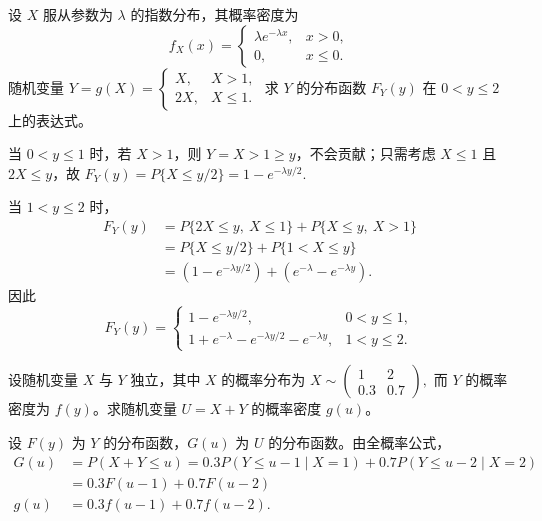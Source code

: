 \documentclass[lang=cn,11pt]{elegantbook}
\begin{document}
\begin{exercise}\label{exer:src-2012-b-07-2credit}
设 \(X\) 服从参数为 \(\lambda\) 的指数分布，其概率密度为
\[
f_X(x)=
\begin{cases}
\lambda e^{-\lambda x}, & x>0,\\
0, & x\le0.
\end{cases}
\]
随机变量
\(
Y=g(X)=
\begin{cases}
X, & X>1,\\
2X, & X\le1.
\end{cases}
\)
求 \(Y\) 的分布函数 \(F_Y(y)\) 在 \(0<y\le2\) 上的表达式。
\end{exercise}
\begin{solution}
当 \(0<y\le1\) 时，若 \(X>1\)，则 \(Y=X>1\ge y\)，不会贡献；只需考虑 \(X\le1\) 且 \(2X\le y\)，故
\(
F_Y(y)=P\{X\le y/2\}=1-e^{-\lambda y/2}.
\)

当 \(1<y\le2\) 时，
\[
\begin{aligned}
F_Y(y)
&=P\{2X\le y,\ X\le1\}+P\{X\le y,\ X>1\}\\
&=P\{X\le y/2\}+P\{1<X\le y\}\\
&=(1-e^{-\lambda y/2})+(e^{-\lambda}-e^{-\lambda y}).
\end{aligned}
\]
因此
\[
F_Y(y)=
\begin{cases}
1-e^{-\lambda y/2}, & 0<y\le1,\\
1+e^{-\lambda}-e^{-\lambda y/2}-e^{-\lambda y}, & 1<y\le2.
\end{cases}
\]
\end{solution}

\begin{exercise}\label{exer:src-2011-a-06-2credit}
设随机变量 \(X\) 与 \(Y\) 独立，其中 \(X\) 的概率分布为
\(
X\sim
\begin{pmatrix}
1 & 2\\
0.3 & 0.7
\end{pmatrix},
\)
而 \(Y\) 的概率密度为 \(f(y)\)。求随机变量 \(U=X+Y\) 的概率密度 \(g(u)\)。
\end{exercise}
\begin{solution}
设 \(F(y)\) 为 \(Y\) 的分布函数，\(G(u)\) 为 \(U\) 的分布函数。由全概率公式，
\[
\begin{aligned}
G(u)
&=P(X+Y\le u)=0.3P(Y\le u-1\mid X=1)+0.7P(Y\le u-2\mid X=2)\\
&=0.3F(u-1)+0.7F(u-2)\\
g(u)&=0.3f(u-1)+0.7f(u-2).
\end{aligned}
\]
\end{solution}
\end{document}
